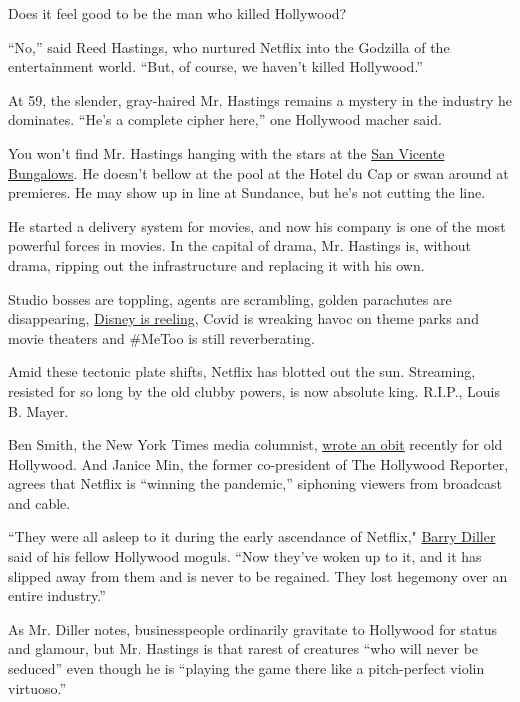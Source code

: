Does it feel good to be the man who killed Hollywood?

``No,'' said Reed Hastings, who nurtured Netflix into the Godzilla of
the entertainment world. ``But, of course, we haven't killed
Hollywood.''

At 59, the slender, gray-haired Mr. Hastings remains a mystery in the
industry he dominates. ``He's a complete cipher here,'' one Hollywood
macher said.

You won't find Mr. Hastings hanging with the stars at the
\href{https://www.nytimes3xbfgragh.onion/2019/02/23/style/san-vicente-bungalows-jeff-klein.html}{San
Vicente Bungalows}. He doesn't bellow at the pool at the Hotel du Cap or
swan around at premieres. He may show up in line at Sundance, but he's
not cutting the line.

He started a delivery system for movies, and now his company is one of
the most powerful forces in movies. In the capital of drama, Mr.
Hastings is, without drama, ripping out the infrastructure and replacing
it with his own.

Studio bosses are toppling, agents are scrambling, golden parachutes are
disappearing,
\href{https://www.nytimes3xbfgragh.onion/2020/08/04/business/media/disney-earnings-coronavirus.html}{Disney
is reeling}, Covid is wreaking havoc on theme parks and movie theaters
and \#MeToo is still reverberating.

Amid these tectonic plate shifts, Netflix has blotted out the sun.
Streaming, resisted for so long by the old clubby powers, is now
absolute king. R.I.P., Louis B. Mayer.

Ben Smith, the New York Times media columnist,
\href{https://www.nytimes3xbfgragh.onion/2020/08/16/business/media/hollywood-studios-firings-streaming.html}{wrote
an obit} recently for old Hollywood. And Janice Min, the former
co-president of The Hollywood Reporter, agrees that Netflix is ``winning
the pandemic,'' siphoning viewers from broadcast and cable.

``They were all asleep to it during the early ascendance of Netflix,"
\href{https://www.nytimes3xbfgragh.onion/2018/03/24/style/barry-diller-iac.html}{Barry
Diller} said of his fellow Hollywood moguls. ``Now they've woken up to
it, and it has slipped away from them and is never to be regained. They
lost hegemony over an entire industry.''

As Mr. Diller notes, businesspeople ordinarily gravitate to Hollywood
for status and glamour, but Mr. Hastings is that rarest of creatures
``who will never be seduced'' even though he is ``playing the game there
like a pitch-perfect violin virtuoso.''


